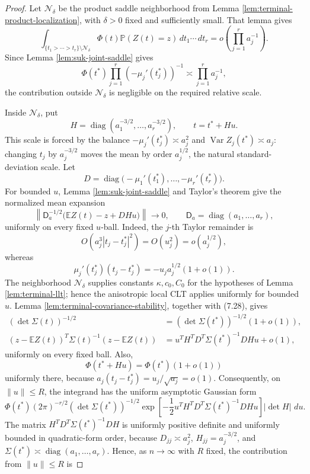\documentclass[11pt]{article}
\theoremstyle{remark}
\newcommand{\Pp}{\mathbb P}
\newcommand{\Ee}{\mathbb E}
\newcommand{\Var}{\operatorname{Var}}
\newcommand{\diag}{\operatorname{diag}}
\newcommand{\dd}{\,d}
\begin{document}
\begin{proof}
Let \(\mathcal N_\delta\) be the product saddle neighborhood from Lemma \ref{lem:terminal-product-localization}, with \(\delta>0\) fixed and sufficiently small.  That lemma gives
\[
        \int_{\{t_1>\cdots>t_r\}\setminus\mathcal N_\delta}
        \Phi(t)\Pp(Z(t)=z)\dd t_1\cdots\dd t_r
        =o\left(\prod_{j=1}^r a_j^{-1}\right).
\]
Since Lemma \ref{lem:suk-joint-saddle} gives
\[
        \Phi(t^*)\prod_{j=1}^r(-\mu_j'(t_j^*))^{-1}
        \asymp \prod_{j=1}^r a_j^{-1},
\]
the contribution outside \(\mathcal N_\delta\) is negligible on the required relative scale.

Inside \(\mathcal N_\delta\), put
\[
        H=\diag(a_1^{-3/2},\ldots,a_r^{-3/2}),
        \qquad
        t=t^*+Hu .
\]
This scale is forced by the balance
\(-\mu_j'(t_j^*)\asymp a_j^2\) and \(\Var Z_j(t^*)\asymp a_j\): changing \(t_j\) by \(a_j^{-3/2}\) moves the mean by order \(a_j^{1/2}\), the natural standard-deviation scale.  Let
\[
        D=\diag\bigl(-\mu_1'(t_1^*),\ldots,-\mu_r'(t_r^*)\bigr).
\]
For bounded \(u\), Lemma \ref{lem:suk-joint-saddle} and Taylor's theorem give the normalized mean expansion
\[
        \left\|
        \mathsf D_a^{-1/2}
        \bigl(\Ee Z(t)-z+DHu\bigr)
        \right\|\longrightarrow0,
        \qquad \mathsf D_a=\diag(a_1,\ldots,a_r),
        \tag{7.28}
\]
uniformly on every fixed \(u\)-ball.  Indeed, the \(j\)-th Taylor remainder is
\[
        O(a_j^3|t_j-t_j^*|^2)=O(u_j^2)=o(a_j^{1/2}),
\]
whereas
\[
        \mu_j'(t_j^*)(t_j-t_j^*)=-u_j a_j^{1/2}(1+o(1)).
\]
The neighborhood \(\mathcal N_\delta\) supplies constants \(\kappa,c_0,C_0\) for the hypotheses of Lemma \ref{lem:terminal-llt}; hence the anisotropic local CLT applies uniformly for bounded \(u\).  Lemma
\ref{lem:terminal-covariance-stability}, together with (7.28), gives
\[
\begin{aligned}
        (\det\Sigma(t))^{-1/2}
        &=(\det\Sigma(t^*))^{-1/2}(1+o(1)),\\
        (z-\Ee Z(t))^T\Sigma(t)^{-1}(z-\Ee Z(t))
        &=u^TH^TD^T\Sigma(t^*)^{-1}DHu+o(1),
\end{aligned}
        \tag{7.29}
\]
uniformly on every fixed ball.  Also,
\[
        \Phi(t^*+Hu)=\Phi(t^*)(1+o(1))
\]
uniformly there, because \(a_j(t_j-t_j^*)=u_j/\sqrt{a_j}=o(1)\).
Consequently, on \(\|u\|\le R\), the integrand has the uniform asymptotic
Gaussian form
\[
        \Phi(t^*)(2\pi)^{-r/2}(\det\Sigma(t^*))^{-1/2}
        \exp\left[-\frac12 u^T H^TD^T\Sigma(t^*)^{-1}DHu\right]
        |\det H|\,\dd u .
\]
The matrix \(H^TD^T\Sigma(t^*)^{-1}DH\) is uniformly positive definite and uniformly bounded in quadratic-form order, because \(D_{jj}\asymp a_j^2\), \(H_{jj}=a_j^{-3/2}\), and \(\Sigma(t^*)\asymp\diag(a_1,\ldots,a_r)\).  Hence, as \(n\to\infty\) with \(R\) fixed, the contribution from \(\|u\|\le R\) is

\end{proof}
\end{document}
